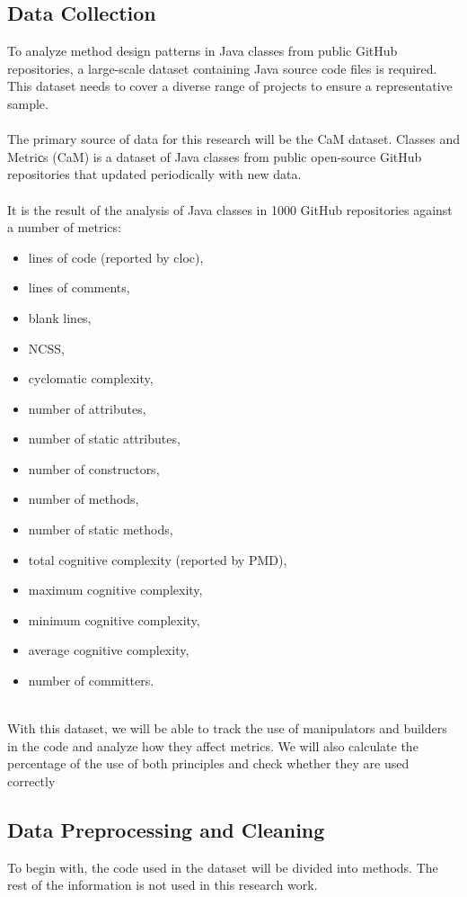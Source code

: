 \documentclass[draft]{article}
\begin{document}
\subsection{Data Collection}
To analyze method design patterns in Java classes from public GitHub repositories, a large-scale dataset containing Java source code files is required. This dataset needs to cover a diverse range of projects to ensure a representative sample.\\
~\\
The primary source of data for this research will be the CaM dataset. Classes and Metriсs (CaM) is a dataset of Java classes from public open-source GitHub repositories that updated periodically with new data.\\
~\\
It is the result of the analysis of Java classes in 1000 GitHub repositories against a number of metrics:
\begin{itemize}
\item lines of code (reported by cloc),
\item lines of comments,
\item blank lines,
\item NCSS,
\item cyclomatic complexity,
\item number of attributes,
\item number of static attributes,
\item number of constructors,
\item number of methods,
\item number of static methods,
\item total cognitive complexity (reported by PMD),
\item maximum cognitive complexity,
\item minimum cognitive complexity,
\item average cognitive complexity,
\item number of committers.
\end{itemize}
~\\
With this dataset, we will be able to track the use of manipulators and builders in the code and analyze how they affect metrics. We will also calculate the percentage of the use of both principles and check whether they are used correctly\\
\subsection{Data Preprocessing and Cleaning}
To begin with, the code used in the dataset will be divided into methods. The rest of the information is not used in this research work.\\
\end{document}
